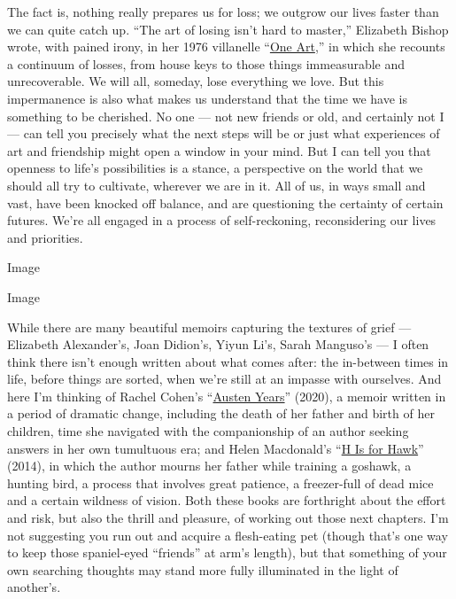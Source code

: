 The fact is, nothing really prepares us for loss; we outgrow our lives
faster than we can quite catch up. ``The art of losing isn't hard to
master,'' Elizabeth Bishop wrote, with pained irony, in her 1976
villanelle
``\href{https://www.poetryfoundation.org/poems/47536/one-art}{One
Art},'' in which she recounts a continuum of losses, from house keys to
those things immeasurable and unrecoverable. We will all, someday, lose
everything we love. But this impermanence is also what makes us
understand that the time we have is something to be cherished. No one
--- not new friends or old, and certainly not I --- can tell you
precisely what the next steps will be or just what experiences of art
and friendship might open a window in your mind. But I can tell you that
openness to life's possibilities is a stance, a perspective on the world
that we should all try to cultivate, wherever we are in it. All of us,
in ways small and vast, have been knocked off balance, and are
questioning the certainty of certain futures. We're all engaged in a
process of self-reckoning, reconsidering our lives and priorities.

Image

Image

While there are many beautiful memoirs capturing the textures of grief
--- Elizabeth Alexander's, Joan Didion's, Yiyun Li's, Sarah Manguso's
--- I often think there isn't enough written about what comes after: the
in-between times in life, before things are sorted, when we're still at
an impasse with ourselves. And here I'm thinking of Rachel Cohen's
``\href{https://www.nytimes3xbfgragh.onion/2020/07/21/books/review/austen-years-rachel-cohen.html}{Austen
Years}'' (2020), a memoir written in a period of dramatic change,
including the death of her father and birth of her children, time she
navigated with the companionship of an author seeking answers in her own
tumultuous era; and Helen Macdonald's
``\href{https://www.nytimes3xbfgragh.onion/2015/02/22/books/review/helen-macdonalds-h-is-for-hawk.html}{H
Is for Hawk}'' (2014), in which the author mourns her father while
training a goshawk, a hunting bird, a process that involves great
patience, a freezer-full of dead mice and a certain wildness of vision.
Both these books are forthright about the effort and risk, but also the
thrill and pleasure, of working out those next chapters. I'm not
suggesting you run out and acquire a flesh-eating pet (though that's one
way to keep those spaniel-eyed ``friends'' at arm's length), but that
something of your own searching thoughts may stand more fully
illuminated in the light of another's.

